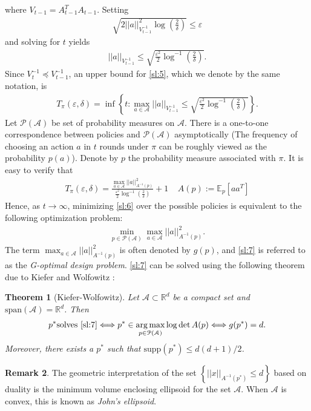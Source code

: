 \documentclass[letterpaper,11pt,openright,openany]{book}
\numberwithin{equation}{section}
\theoremstyle{plain}
\newtheorem{Th}{Theorem}[section]
\theoremstyle{definition}
\newtheorem{Rem}[Th]{Remark}
\def\R{{\mathbb R}}
\def\E{{\mathbb E}}
\def\R{{\mathbb R}}
\def\e{{\varepsilon}}
\DeclareMathOperator*{\argmax}{arg\,max}
\begin{document}
where $V_{t-1} = A^T_{t-1}A_{t-1}$. Setting 
\begin{align*}
\sqrt{2||a||^2_{V_{t-1}^{-1}}\log\left(\frac{2}{\delta}\right)}\leq\e
\end{align*}
and solving for $t$ yields
\begin{align}
||a||_{V_{t-1}^{-1}}\leq\sqrt{\frac{\e^2}{2}\log^{-1}\left(\frac{2}{\delta}\right)}.\label{margin}
\end{align}
Since $V_t^{-1}\preceq V^{-1}_{t-1}$, an upper bound for \eqref{sl:5}, which we denote by the same notation, is
\begin{align}
T_{\pi}(\e, \delta) = \inf\left\{t: \max_{a\in\mathcal A}||a||_{V_{t-1}^{-1}}\leq \sqrt{\frac{\e^2}{2}\log^{-1}\left(\frac{2}{\delta}\right)}\right\}.\label{sl:6}
\end{align}
Let $\mathcal P(\mathcal A)$ be set of probability measures on $\mathcal A$. There is a one-to-one correspondence between policies and $\mathcal P(\mathcal A)$ asymptotically (The frequency of choosing an action $a$ in $t$ rounds under $\pi$ can be roughly viewed as the probability $p(a)$). Denote by $p$ the probability measure associated with $\pi$. It is easy to verify that 
\begin{align*}
T_{\pi}(\e, \delta) = \frac{\max_{a\in\mathcal A}||a||^2_{A^{-1}(p)}}{\frac{\e^2}{2}\log^{-1}\left(\frac{2}{\delta}\right)}+1\ \ \ \ \ A(p):=\E_p[aa^T]
\end{align*}
Hence, as $t\to\infty$, minimizing \eqref{sl:6} over the possible policies is equivalent to the following optimization problem:
\begin{align}
\min_{p\in\mathcal P(\mathcal A)}\max_{a\in\mathcal A}||a||^2_{A^{-1}(p)}.\label{sl:7}
\end{align}
The term $\max_{a\in\mathcal A}||a||^2_{A^{-1}(p)}$ is often denoted by $g(p)$, and \eqref{sl:7} is referred to as the \emph{G-optimal design problem}. \eqref{sl:7} can be solved using the following theorem due to Kiefer and Wolfowitz \cite{Kiefer_1985}:
\begin{Th}[Kiefer-Wolfowitz]\label{KW}
Let $\mathcal A\subset\R^d$ be a compact set and $\text{span}(\mathcal A)=\R^d$. Then
\begin{align*}
p^*\text{solves \eqref{sl:7}}\Longleftrightarrow p^*\in\argmax_{p\in\mathcal P(\mathcal A)}\log\det A(p)\Longleftrightarrow g(p^*) = d. 
\end{align*}
Moreover, there exists a $p^*$ such that $\text{supp}(p^*)\leq d(d+1)/2$. 
\end{Th}
\begin{Rem}
The geometric interpretation of the set $\left\{||x||_{A^{-1}(p^*)}\leq d\right\}$ based on duality is the minimum volume enclosing ellipsoid for the set $\mathcal A$. When $\mathcal A$ is convex, this is known as \emph{John's ellipsoid}.  
\end{Rem}
\end{document}
